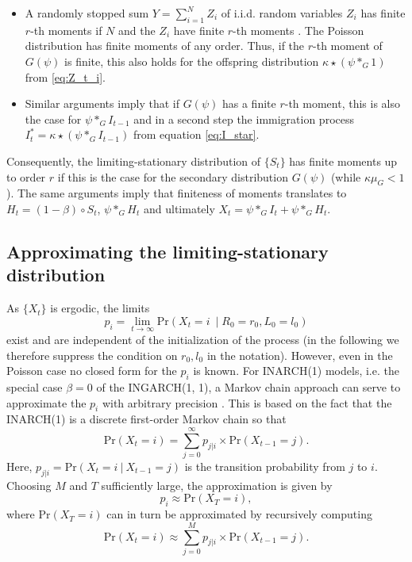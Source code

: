 \documentclass[review]{elsarticle}
\begin{document}
\begin{itemize}
\item A randomly stopped sum $Y = \sum_{i = 1}^N Z_i$ of i.i.d. random variables $Z_i$ has finite $r$-th moments if $N$ and the $Z_i$ have finite $r$-th moments \cite[Theorem 5.2]{Gut2009}. The Poisson distribution has finite moments of any order. Thus, if the $r$-th moment of $G(\psi)$ is finite, this also holds for the offspring distribution $\kappa \star (\psi *_G 1)$ from \eqref{eq:Z_t_i}.
\item Similar arguments imply that if $G(\psi)$ has a finite $r$-th moment, this is also the case for $\psi *_G I_{t - 1}$ and in a second step the immigration process $I^*_t = \kappa \star(\psi *_G I_{t - 1})$ from equation \eqref{eq:I_star}.
\end{itemize}
Consequently, the limiting-stationary distribution of $\{S_t\}$ has finite moments up to order $r$ if this is the case for the secondary distribution $G(\psi)$ (while $\kappa\mu_G < 1$). The same arguments imply that finiteness of moments translates to $H_t = (1 - \beta) \circ S_t$, $\psi *_G H_t$ and ultimately $X_t = \psi *_G I_t + \psi *_G H_t$.
%
%

\subsection{Approximating the limiting-stationary distribution}

As $\{X_t\}$ is ergodic, the limits
$$
p_i = \lim_{t \rightarrow \infty} \text{Pr}(X_t = i \ \mid R_0 = r_0, L_0 = l_0)
$$
exist and are independent of the initialization of the process (in the following we therefore suppress the condition on $r_0, l_0$ in the notation). However, even in the Poisson case no closed form for the $p_i$ is known. For INARCH(1) models, i.e. the special case $\beta = 0$ of the INGARCH(1, 1), a Markov chain approach can serve to approximate the $p_i$ with arbitrary precision \cite{Weiss2010}. This is based on the fact that the INARCH(1) is a discrete first-order Markov chain so that
$$
\text{Pr}(X_t = i) = \sum_{j = 0}^\infty p_{j|i} \times \text{Pr}(X_{t - 1} = j).
$$
Here, $p_{j|i} = \text{Pr}(X_t = i \ | \ X_{t - 1} = j) $ is the transition probability from $j$ to $i$. Choosing $M$ and $T$ sufficiently large, the approximation is given by
$$
p_i \approx \text{Pr}(X_T = i),
$$
where $\text{Pr}(X_T = i)$ can in turn be approximated by recursively computing
$$
\text{Pr}(X_t = i) \approx \sum_{j = 0}^M p_{j|i} \times \text{Pr}(X_{t - 1} = j).
$$
\end{document}
